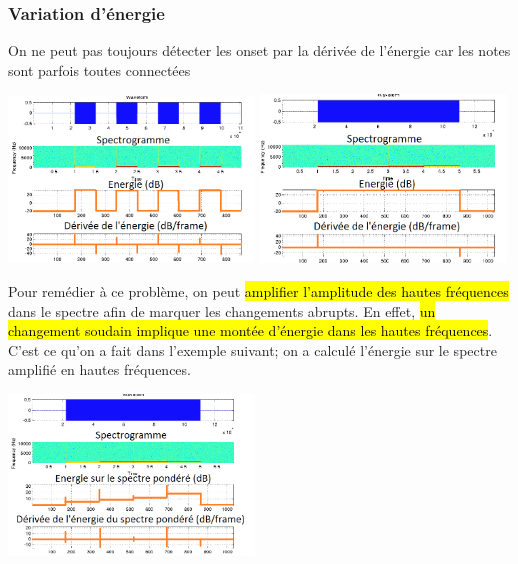 \documentclass[letterpaper, 12pt]{article}
\newcommand{\alinea}{
\hspace*{0.5cm}}
\begin{document}
			\subsubsection{Variation d'énergie}
				\alinea On ne peut pas toujours détecter les onset par la dérivée de l'énergie car les notes sont parfois toutes
					connectées
				\begin{center}
					\includegraphics[width=0.49\textwidth]{Images/onset-ex} \includegraphics[width=0.49\textwidth]{Images/onset-ex2}
				\end{center}
				\alinea Pour remédier à ce problème, on peut \hl{amplifier l'amplitude des hautes fréquences} dans le spectre afin de 
					marquer les changements abrupts. En effet, \hl{un changement soudain implique une montée d'énergie dans les hautes
					fréquences}. C'est ce qu'on a fait dans l'exemple suivant; on a calculé l'énergie sur le spectre amplifié en hautes
					fréquences. 
				\begin{center}
					\includegraphics[width=0.49\textwidth]{Images/onset-amplified}
				\end{center}
\end{document}
